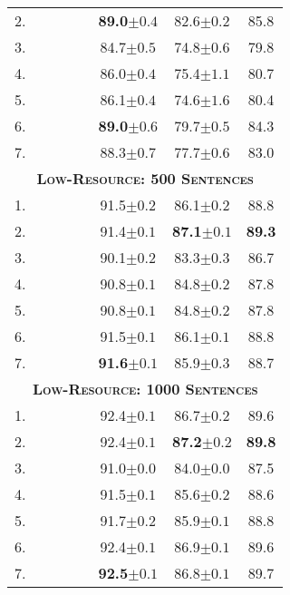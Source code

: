\documentclass[11pt,a4paper]{article}
\newcommand{\cmark}{\textcolor{blue}{\ding{51}}}
\newcommand{\xmark}{\textcolor{red}{\ding{55}}}
\begin{document}
\begin{table}[]
\begin{tabular}{l|cccc||cc|c}
2. & \xmark & \cmark & \cmark & \xmark & \textbf{89.0}$\pm0.4$ & 82.6$\pm0.2$ & 85.8 \\
3. & \cmark & \xmark & \xmark & \xmark & 84.7$\pm0.5$ & 74.8$\pm0.6$ & 79.8 \\
4. & \cmark & \xmark & \cmark & \xmark & 86.0$\pm0.4$ & 75.4$\pm1.1$ & 80.7 \\
5. & \cmark & \xmark & \cmark & \cmark & 86.1$\pm0.4$ & 74.6$\pm1.6$ & 80.4 \\
6. & \cmark & \cmark & \cmark & \xmark & \textbf{89.0}$\pm0.6$ & 79.7$\pm0.5$ & 84.3 \\
7. & \cmark & \cmark & \cmark & \cmark & 88.3$\pm0.7$ & 77.7$\pm0.6$ & 83.0 \\
\hline\hline
\multicolumn{8}{c}{\bf \textsc{Low-Resource: 500 Sentences}}\\
\hline
1. & \xmark & \cmark & \xmark & \xmark & 91.5$\pm0.2$ & 86.1$\pm0.2$ & 88.8 \\
2. & \xmark & \cmark & \cmark & \xmark & 91.4$\pm0.1$ & \textbf{87.1}$\pm0.1$ & \textbf{89.3} \\
3. & \cmark & \xmark & \xmark & \xmark & 90.1$\pm0.2$ & 83.3$\pm0.3$ & 86.7 \\
4. & \cmark & \xmark & \cmark & \xmark & 90.8$\pm0.1$ & 84.8$\pm0.2$ & 87.8 \\
5. & \cmark & \xmark & \cmark & \cmark & 90.8$\pm0.1$ & 84.8$\pm0.2$ & 87.8 \\
6. & \cmark & \cmark & \cmark & \xmark & 91.5$\pm0.1$ & 86.1$\pm0.1$ & 88.8 \\
7. & \cmark & \cmark & \cmark & \cmark & \textbf{91.6}$\pm0.1$ & 85.9$\pm0.3$ & 88.7 \\
\hline\hline
\multicolumn{8}{c}{\bf \textsc{Low-Resource: 1000 Sentences}}\\
\hline
1. & \xmark & \cmark & \xmark & \xmark & 92.4$\pm0.1$ & 86.7$\pm0.2$ & 89.6 \\
2. & \xmark & \cmark & \cmark & \xmark & 92.4$\pm0.1$ & \textbf{87.2}$\pm0.2$ & \textbf{89.8} \\
3. & \cmark & \xmark & \xmark & \xmark & 91.0$\pm0.0$ & 84.0$\pm0.0$ & 87.5 \\
4. & \cmark & \xmark & \cmark & \xmark & 91.5$\pm0.1$ & 85.6$\pm0.2$ & 88.6 \\
5. & \cmark & \xmark & \cmark & \cmark & 91.7$\pm0.2$ & 85.9$\pm0.1$ & 88.8 \\
6. & \cmark & \cmark & \cmark & \xmark & 92.4$\pm0.1$ & 86.9$\pm0.1$ & 89.6 \\
7. & \cmark & \cmark & \cmark & \cmark & \textbf{92.5}$\pm0.1$ & 86.8$\pm0.1$ & 89.7 \\

\end{tabular}
\end{table}
\end{document}
